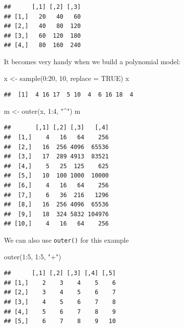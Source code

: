 \documentclass[
]{book}
\newenvironment{Shaded}{\begin{snugshade}}{\end{snugshade}}
\newcommand{\AttributeTok}[1]{\textcolor[rgb]{0.77,0.63,0.00}{#1}}
\newcommand{\ConstantTok}[1]{\textcolor[rgb]{0.00,0.00,0.00}{#1}}
\newcommand{\DecValTok}[1]{\textcolor[rgb]{0.00,0.00,0.81}{#1}}
\newcommand{\FunctionTok}[1]{\textcolor[rgb]{0.00,0.00,0.00}{#1}}
\newcommand{\NormalTok}[1]{#1}
\newcommand{\OtherTok}[1]{\textcolor[rgb]{0.56,0.35,0.01}{#1}}
\newcommand{\SpecialCharTok}[1]{\textcolor[rgb]{0.00,0.00,0.00}{#1}}
\newcommand{\StringTok}[1]{\textcolor[rgb]{0.31,0.60,0.02}{#1}}
\begin{document}
\begin{verbatim}
##      [,1] [,2] [,3]
## [1,]   20   40   60
## [2,]   40   80  120
## [3,]   60  120  180
## [4,]   80  160  240
\end{verbatim}

It becomes very handy when we build a polynomial model:

\begin{Shaded}
\begin{Highlighting}[]
\NormalTok{x }\OtherTok{\textless{}{-}} \FunctionTok{sample}\NormalTok{(}\DecValTok{0}\SpecialCharTok{:}\DecValTok{20}\NormalTok{, }\DecValTok{10}\NormalTok{, }\AttributeTok{replace =} \ConstantTok{TRUE}\NormalTok{)}
\NormalTok{x}
\end{Highlighting}
\end{Shaded}

\begin{verbatim}
##  [1]  4 16 17  5 10  4  6 16 18  4
\end{verbatim}

\begin{Shaded}
\begin{Highlighting}[]
\NormalTok{m }\OtherTok{\textless{}{-}} \FunctionTok{outer}\NormalTok{(x, }\DecValTok{1}\SpecialCharTok{:}\DecValTok{4}\NormalTok{, }\StringTok{"\^{}"}\NormalTok{)}
\NormalTok{m}
\end{Highlighting}
\end{Shaded}

\begin{verbatim}
##       [,1] [,2] [,3]   [,4]
##  [1,]    4   16   64    256
##  [2,]   16  256 4096  65536
##  [3,]   17  289 4913  83521
##  [4,]    5   25  125    625
##  [5,]   10  100 1000  10000
##  [6,]    4   16   64    256
##  [7,]    6   36  216   1296
##  [8,]   16  256 4096  65536
##  [9,]   18  324 5832 104976
## [10,]    4   16   64    256
\end{verbatim}

We can also use \texttt{outer()} for this example

\begin{Shaded}
\begin{Highlighting}[]
\FunctionTok{outer}\NormalTok{(}\DecValTok{1}\SpecialCharTok{:}\DecValTok{5}\NormalTok{, }\DecValTok{1}\SpecialCharTok{:}\DecValTok{5}\NormalTok{, }\StringTok{"+"}\NormalTok{)}
\end{Highlighting}
\end{Shaded}

\begin{verbatim}
##      [,1] [,2] [,3] [,4] [,5]
## [1,]    2    3    4    5    6
## [2,]    3    4    5    6    7
## [3,]    4    5    6    7    8
## [4,]    5    6    7    8    9
## [5,]    6    7    8    9   10
\end{verbatim}
\end{document}
